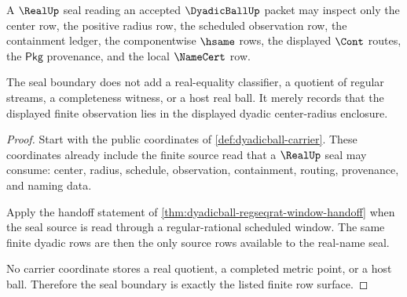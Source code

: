 \begin{theorem}
\label{thm:dyadicball-real-seal-boundary}
A $\RealUp$ seal reading an accepted $\DyadicBallUp$ packet may inspect only
the center row, the positive radius row, the scheduled observation row, the
containment ledger, the componentwise $\hsame$ rows, the displayed $\Cont$
routes, the $\mathsf{Pkg}$ provenance, and the local $\NameCert$ row.

The seal boundary does not add a real-equality classifier, a quotient of
regular streams, a completeness witness, or a host real ball. It merely records
that the displayed finite observation lies in the displayed dyadic
center-radius enclosure.
\end{theorem}
\begin{proof}
Start with the public coordinates of \autoref{def:dyadicball-carrier}. These
coordinates already include the finite source read that a $\RealUp$ seal may
consume: center, radius, schedule, observation, containment, routing,
provenance, and naming data.

Apply the handoff statement of
\autoref{thm:dyadicball-regseqrat-window-handoff} when the seal source is read
through a regular-rational scheduled window. The same finite dyadic rows are
then the only source rows available to the real-name seal.

No carrier coordinate stores a real quotient, a completed metric point, or a
host ball. Therefore the seal boundary is exactly the listed finite row
surface.
\end{proof}

